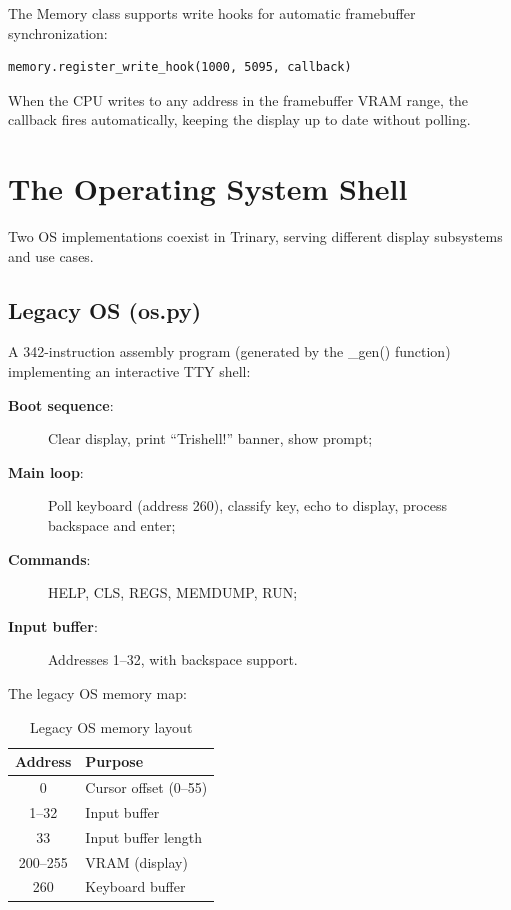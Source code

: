 \documentclass[12pt,a4paper,twoside]{book}
\theoremstyle{trinarytheorem}
\theoremstyle{trinarydefinition}
\newcommand{\code}[1]{\textsf{#1}}
\begin{document}
The \code{Memory} class supports write hooks for automatic framebuffer
synchronization:
\begin{verbatim}
memory.register_write_hook(1000, 5095, callback)
\end{verbatim}
When the CPU writes to any address in the framebuffer VRAM range, the callback fires
automatically, keeping the display up to date without polling.

\chapter{The Operating System Shell}
\label{ch:os}

Two OS implementations coexist in Trinary, serving different display subsystems and
use cases.

\section{Legacy OS (\code{os.py})}

A 342-instruction assembly program (generated by the \code{\_gen()} function)
implementing an interactive TTY shell:

\begin{description}
    \item[\textbf{Boot sequence}:] Clear display, print ``Trishell!'' banner, show
          prompt;
    \item[\textbf{Main loop}:] Poll keyboard (address 260), classify key, echo to
          display, process backspace and enter;
    \item[\textbf{Commands}:] HELP, CLS, REGS, MEMDUMP, RUN;
    \item[\textbf{Input buffer}:] Addresses 1--32, with backspace support.
\end{description}

The legacy OS memory map:
\begin{table}[H]
\centering
\caption{Legacy OS memory layout}
\label{tab:osmem}
\begin{tabular}{cl}
\toprule
Address & Purpose \\
\midrule
0 & Cursor offset (0--55) \\
1--32 & Input buffer \\
33 & Input buffer length \\
200--255 & VRAM (display) \\
260 & Keyboard buffer \\
\bottomrule
\end{tabular}
\end{table}
\end{document}
